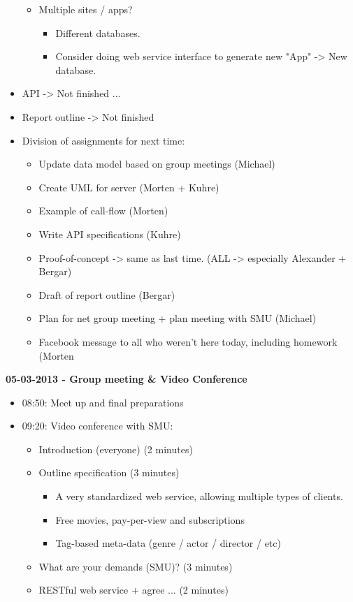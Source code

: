 \documentclass[11pt]{article}
\begin{document}
\begin{landscape}
\begin{multicols}{2}
\begin{itemize}
\begin{itemize}
\item Multiple sites / apps?
\begin{itemize}
\item Different databases.
\item Consider doing web service interface to generate new "App" -> New database.
\end{itemize}
\end{itemize}
\item API -> Not finished ...
\item Report outline -> Not finished
\item Division of assignments for next time:
\begin{itemize}
\item Update data model based on group meetings (Michael)
\item Create UML for server (Morten + Kuhre)
\item Example of call-flow (Morten)
\item Write API specifications (Kuhre)
\item Proof-of-concept -> same as last time. (ALL -> especially Alexander + Bergar)
\item Draft of report outline (Bergar)
\item Plan for net group meeting + plan meeting with SMU (Michael)
\item Facebook message to all who weren't here today, including homework (Morten
\end{itemize}
\end{itemize}

\textbf{05-03-2013 - Group meeting \& Video Conference}
\begin{itemize}
\item 08:50: Meet up and final preparations
\item 09:20: Video conference with SMU:
\begin{itemize}
\item Introduction (everyone) (2 minutes)
\item Outline specification (3 minutes)
\begin{itemize}
\item A very standardized web service, allowing multiple types of clients.
\item Free movies, pay-per-view and subscriptions
\item Tag-based meta-data (genre / actor / director / etc)
\end{itemize}
\item What are your demands (SMU)? (3 minutes)
\item RESTful web service + agree ... (2 minutes)
\end{itemize}
\end{itemize}


\end{multicols}
\end{landscape}
\end{document}
